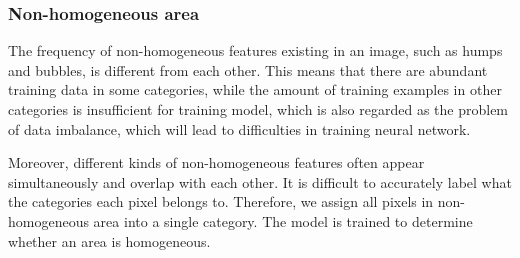 \documentclass[pdflatex,sn-mathphys]{sn-jnl}%
\theoremstyle{thmstyleone}%
\theoremstyle{thmstyletwo}%
\theoremstyle{thmstylethree}%
\begin{document}
\subsubsection{Non-homogeneous area}\label{2.2.2}

The frequency of non-homogeneous features existing in an image, such as humps and bubbles, is different from each other.
This means that there are abundant training data in some categories, while the amount of training examples in other categories is insufficient for training model, which is also regarded as the problem of data imbalance, which will lead to difficulties in training neural network.

Moreover, different kinds of non-homogeneous features often appear simultaneously and overlap with each other.
It is difficult to accurately label what the categories each pixel belongs to.
Therefore, we assign all pixels in non-homogeneous area into a single category. 
The model is trained to determine whether an area is homogeneous.
\end{document}
